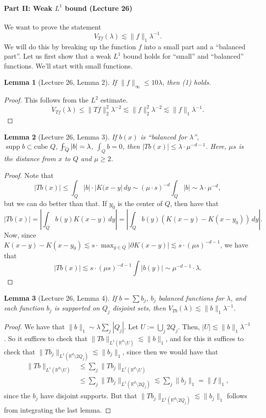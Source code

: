 \documentclass[UTF8,11pt]{ctexart}
\newtheorem*{lemma}{Lemma}
\theoremstyle{definition}
\DeclareMathOperator{\supp}{supp}
\newcommand{\R}{\mathbb R}
\providecommand{\fint}{\mathop{\rlap{\hspace{0.18em}$-$}\!\int}}
\begin{document}
\paragraph{Part II: Weak $L^1$ bound (Lecture 26)}
We want to prove the statement
\[V_{Tf}(\lambda)\lesssim\|f\|_1\lambda^{-1}.\tag{1}\]
We will do this by breaking up the function $f$ into a small part and a ``balanced part''. Let us first show that a weak $L^1$ bound holds for ``small'' and ``balanced'' functions. We'll start with small functions.
\begin{lemma}[Lecture 26, Lemma 2]
If $\|f\|_\infty\leq10\lambda$, then (1) holds.
\end{lemma}
\begin{proof}
This follows from the $L^2$ estimate.
\[V_{Tf}(\lambda)\leq\|Tf\|_2^2\lambda^{-2}\lesssim\|f\|_2^2\lambda^{-2}\lesssim\|f\|_1\lambda^{-1}.\]
\end{proof}
\begin{lemma}[Lecture 26, Lemma 3]
If $b(x)$ is ``balanced for $\lambda$'', $\supp b\subset\text{cube }Q$, $\fint_Q|b|=\lambda$, $\int_Qb=0$, then $|Tb(x)|\leq\lambda\cdot\mu^{-d-1}$. Here, $\mu s$ is the distance from $x$ to $Q$ and $\mu\geq2$.
\end{lemma}
\begin{proof}
Note that
\[|Tb(x)|\leq\int_Q|b|\cdot|K(x-y|\,dy\sim(\mu\cdot s)^{-d}\int_Q|b|\sim\lambda\cdot\mu^{-d},\]
but we can do better than that. If $y_0$ is the center of $Q$, then have that
\[|Tb(x)|=\left|\int_Qb(y)K(x-y)\,dy\right|=\left|\int_Qb(y)(K(x-y)-K(x-y_0))\,dy\right|.\]
Now, since $K(x-y)-K(x-y_0)\lesssim s\cdot\max_{y\in Q}|\partial K(x-y)|\lesssim s\cdot(\mu s)^{-d-1}$, we have that
\[|Tb(x)|\lesssim s\cdot(\mu s)^{-d-1}\int|b(y)|\sim\mu^{-d-1}\cdot\lambda.\]
\end{proof}
\begin{lemma}[Lecture 26, Lemma 4]
If $b=\sum b_j$, $b_j$ balanced functions for $\lambda$, and each function $b_j$ is supported on $Q_j$ disjoint sets, then $V_{Tb}(\lambda)\lesssim\|b\|_1\lambda^{-1}$.
\end{lemma}
\begin{proof}
We have that $\|b\|_1\sim\lambda\sum_j|Q_j|$. Let $U:=\bigcup_j2Q_j$. Then, $|U|\lesssim\|b\|_1\lambda^{-1}$. So it suffices to check that $\|Tb\|_{L^1(\R^d\setminus U)}\lesssim\|b\|_1$, and for this it suffices to check that $\|Tb_j\|_{L^1(\R^d\setminus2Q_j)}\lesssim\|b_j\|_1$, since then we would have that
\begin{align*}
\|Tb\|_{L^1(\R^d\setminus U)}&\leq\sum_j\|Tb_j\|_{L^1(\R^d\setminus U)}\\
&\leq\sum_j\|Tb_j\|_{L^1(\R^d\setminus2Q_j)}\lesssim\sum_j\|b_j\|_1=\|f\|_1,
\end{align*}
since the $b_j$ have disjoint supports. But that $\|Tb_j\|_{L^1(\R^d\setminus2Q_j)}\lesssim\|b_j\|_1$ follows from integrating the last lemma.
\end{proof}
\end{document}
